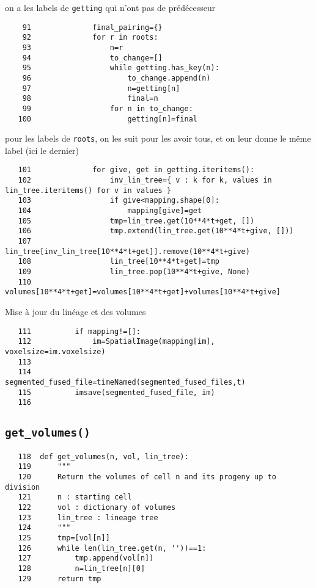 \documentclass{article}
\def \mycolor {red}
\begin{document}
\color{\mycolor}
on a les labels de \verb|getting| qui n'ont pas de pr\'ed\'ecesseur
\color{black}
\begin{verbatim}
    91	            final_pairing={}
    92	            for r in roots:
    93	                n=r
    94	                to_change=[]
    95	                while getting.has_key(n):
    96	                    to_change.append(n)
    97	                    n=getting[n]
    98	                    final=n
    99	                for n in to_change:
   100	                    getting[n]=final
\end{verbatim} 
\color{\mycolor}
pour les labels de \verb|roots|, on les suit pour les avoir tous, et on leur donne le m\^eme label (ici le dernier)
\color{black}
\begin{verbatim}
   101	            for give, get in getting.iteritems():
   102	                inv_lin_tree={ v : k for k, values in lin_tree.iteritems() for v in values }
   103	                if give<mapping.shape[0]:
   104	                    mapping[give]=get
   105	                tmp=lin_tree.get(10**4*t+get, [])
   106	                tmp.extend(lin_tree.get(10**4*t+give, []))
   107	                lin_tree[inv_lin_tree[10**4*t+get]].remove(10**4*t+give)
   108	                lin_tree[10**4*t+get]=tmp
   109	                lin_tree.pop(10**4*t+give, None)
   110	                volumes[10**4*t+get]=volumes[10**4*t+get]+volumes[10**4*t+give]
\end{verbatim} 
\color{\mycolor}
Mise \`a jour du lin\'eage et des volumes
\color{black}
\begin{verbatim}
   111	        if mapping!=[]:
   112	            im=SpatialImage(mapping[im], voxelsize=im.voxelsize)
   113	            
   114	        segmented_fused_file=timeNamed(segmented_fused_files,t)
   115	        imsave(segmented_fused_file, im)
   116	
\end{verbatim}

\subsection{\texttt{get\_volumes()}}
\label{sec:get:volumes}
\begin{verbatim}    
   118	def get_volumes(n, vol, lin_tree):
   119	    """
   120	    Return the volumes of cell n and its progeny up to division
   121	    n : starting cell
   122	    vol : dictionary of volumes
   123	    lin_tree : lineage tree
   124	    """
   125	    tmp=[vol[n]]
   126	    while len(lin_tree.get(n, ''))==1:
   127	        tmp.append(vol[n])
   128	        n=lin_tree[n][0]
   129	    return tmp
\end{verbatim}
\end{document}
